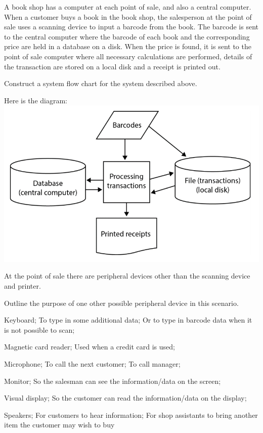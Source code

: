\begin{exercise*} %
A book shop has a computer at each point of sale, and also a central computer. When a customer buys a book in the book shop, the salesperson at the point of sale uses a scanning device to input a barcode from the book. The barcode is sent to the central computer where the barcode of each book and the corresponding price are held in a database on a disk.
When the price is found, it is sent to the point of sale computer where all necessary calculations are performed, details of the transaction are stored on a local disk and a receipt is printed out.
\begin{parts}
	\item Construct a system flow chart for the system described above.
	\begin{solution}
	Here is the diagram:\\
	\includegraphics[scale=0.5]{topic_1_systems/topic_1_exercises/bookstore_diagram}
	\end{solution}
	\newline
	At the point of sale there are peripheral devices other than the scanning device and printer.
	\item Outline the purpose of one other possible peripheral device in this scenario.
	
\begin{solution}
\newline
Keyboard;
To type in some additional data;
Or to type in barcode data when it is not possible to scan;

Magnetic card reader;
Used when a credit card is used;

Microphone;
To call the next customer;
To call manager;

Monitor;
So the salesman can see the information/data on the screen;

Visual display;
So the customer can read the information/data on the display;

Speakers;
For customers to hear information;
For shop assistants to bring another item the customer may wish to buy
\end{solution}
\end{parts}
\end{exercise*}	
	
